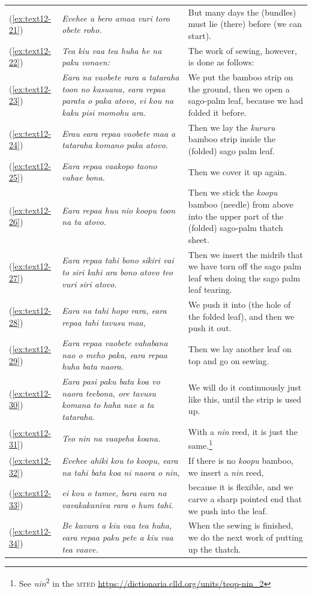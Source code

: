 \documentclass[output=paper]{langscibook}
\begin{document}
\begin{xltabular}{\textwidth}{lXX}
    (\ref{ex:text12-21})&\textit{Evehee a bero amaa vuri toro obete roho.}&But many days the (bundles) must lie (there) before (we can start).\\
    (\ref{ex:text12-22})&\textit{Tea kiu vaa tea huha he na paku vonaen:}&The work of sewing, however, is done as follows:\\
    (\ref{ex:text12-23})&\textit{Eara na vaobete rara a tataraha toon no kasuana, eara repaa parata o paka atovo, ei kou na kaku pisi momohu ara.}&We put the bamboo strip on the ground, then we open a sago-palm leaf, because we had folded it before.\\
    (\ref{ex:text12-24})&\textit{Erau eara repaa vaobete maa a tataraha komano paka atovo.}&Then we lay the \textit{kururu} bamboo strip inside the (folded) sago palm leaf.\\
    (\ref{ex:text12-25})&\textit{Eara repaa vaakopo taono vahae bona.}&Then we cover it up again.\\
    (\ref{ex:text12-26})&\textit{Eara repaa huu nio koopu toon na ta atovo.}&Then we stick the \textit{koopu} bamboo (needle) from above into the upper part of the (folded) sago-palm thatch sheet.\\
    (\ref{ex:text12-27})&\textit{Eara repaa tahi bono sikiri vai to siri kahi ara bono atovo teo vuri siri atovo.}&Then we insert the midrib that we have torn off the sago palm leaf when doing the sago palm leaf tearing.\\
    (\ref{ex:text12-28})&\textit{Eara na tahi hopo rara, eara repaa tahi tavusu maa,}&We push it into (the hole of the folded leaf), and then we push it out.\\
    (\ref{ex:text12-29})&\textit{Eara repaa vaobete vahabana nao o meho paka, eara repaa huha bata naora.}&Then we lay another leaf on top and go on sewing.\\
    (\ref{ex:text12-30})&\textit{Eara pasi paku bata koa vo naora teebona, ore tavusu komana to haha nae a ta tataraha.}&We will do it continuously just like this, until the strip is used up. \\
    (\ref{ex:text12-31})&\textit{Teo nin na vaapeha koana.}&With a \textit{nin} reed, it is just the same.\footnote{See \textit{nin}\textsuperscript{2} in the \textsc{mted} \url{https://dictionaria.clld.org/units/teop-nin_2}}\\
    (\ref{ex:text12-32})&\textit{Evehee ahiki kou to koopu, eara na tahi bata koa ni naora o nin,}&If there is no \textit{koopu} bamboo, we insert a \textit{nin} reed,\\
    (\ref{ex:text12-33})&\textit{ei kou o tamee, bara eara na vavakakaniva rara o hum tahi.}&because it is flexible, and we carve a sharp pointed end that we push into the leaf. \\
    (\ref{ex:text12-34})&\textit{Be kavara a kiu vaa tea huha, eara repaa paku pete a kiu vaa tea vaave.}&When the sewing is finished, we do the next work of putting up the thatch.\\
\end{xltabular}
\end{document}

